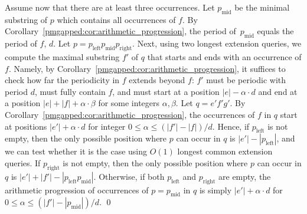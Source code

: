 Assume now that there are at least three occurrences. Let $p_{\text{mid}}$ be the minimal substring of $p$ which contains all occurrences of $f$. By Corollary~\ref{pmgapped:cor:arithmetic_progression}, the period of~$p_{\text{mid}}$ equals the period of $f$, $d$. Let $p=p_{\text{left}} p_{\text{mid}} p_{\text{right}}$. Next, using two longest extension queries, we compute the maximal substring $f'$ of $q$ that starts and ends with an occurrence of $f$. Namely, by Corollary~\ref{pmgapped:cor:arithmetic_progression}, it suffices to check how far the periodicity in $f$ extends beyond $f$: $f'$ must be periodic with period $d$, must fully contain $f$, and must start at a position $|e|-\alpha \cdot d$ and end at a position $|e|+|f|+\alpha \cdot \beta$ for some integers $\alpha, \beta$. Let $q = e'f'g'$. By Corollary~\ref{pmgapped:cor:arithmetic_progression}, the occurrences of $f$ in $q$ start at positions $|e'| + \alpha \cdot d$ for integer $0 \leq \alpha \leq (|f'|-|f|)/d$. Hence, if $p_{\text{left}}$ is not empty, then the only possible position where $p$ can occur in $q$ is $|e'|-|p_{\text{left}}|$, and we can test whether it is the case using $O(1)$ longest common extension queries. If $p_{\text{right}}$ is not empty, then the only possible position where $p$ can occur in $q$ is $|e'|+|f'|-|p_{\text{left}} p_{\text{mid}}|$. Otherwise, if both $p_{\text{left}}$ and $p_{\text{right}}$ are empty, the arithmetic progression of occurrences of $p=p_{\text{mid}}$ in $q$ is simply $|e'|+\alpha \cdot d$ for $0 \leq \alpha \leq (|f'|-|p_{\text{mid}}|)/d$. 
\qed